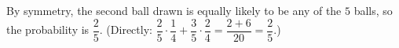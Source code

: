 By symmetry, the second ball drawn is equally likely to be any of the $5$ balls, so the probability is $\boxed{\dfrac25}$. (Directly: $\dfrac25\cdot\dfrac14+\dfrac35\cdot\dfrac24=\dfrac{2+6}{20}=\dfrac25$.)
